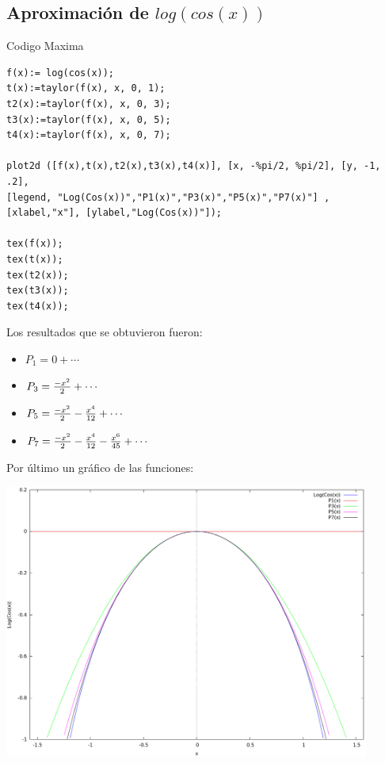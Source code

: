 \documentclass[12pt]{article}
\begin{document}
\subsection{Aproximación de $log(cos(x))$}
Codigo Maxima
\begin{verbatim}
f(x):= log(cos(x));
t(x):=taylor(f(x), x, 0, 1);
t2(x):=taylor(f(x), x, 0, 3);
t3(x):=taylor(f(x), x, 0, 5);
t4(x):=taylor(f(x), x, 0, 7);

plot2d ([f(x),t(x),t2(x),t3(x),t4(x)], [x, -%pi/2, %pi/2], [y, -1, .2],
[legend, "Log(Cos(x))","P1(x)","P3(x)","P5(x)","P7(x)"] ,
[xlabel,"x"], [ylabel,"Log(Cos(x))"]);

tex(f(x));
tex(t(x));
tex(t2(x));
tex(t3(x));
tex(t4(x));
\end{verbatim}
Los resultados que se obtuvieron fueron:
\begin{itemize}
\item{$P_1= 0+\cdots $}
\item{$P_3= {-{x^2}\over{2}}+\cdots  $}
\item{$P_5= {-{x^2}\over{2}}-{{x^4}\over{12}}+\cdots $}
\item{$P_7= {-{x^2}\over{2}}-{{x^4}\over{12}}-{{x^6}\over{45}}+\cdots  $}
\end{itemize}
Por último un gráfico de las funciones:
\begin{center}
\includegraphics[width=12cm]{TaylorLog(cos(x))}
\end{center}
\pagebreak
\end{document}
